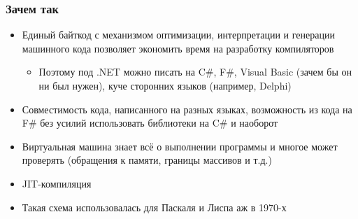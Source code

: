 \documentclass{../../slides-style}
\begin{document}
    \begin{frame}
        \frametitle{Зачем так}
        \begin{itemize}
            \item Единый байткод с механизмом оптимизации, интерпретации и генерации машинного кода позволяет экономить время на разработку компиляторов
            \begin{itemize}
                \item Поэтому под .NET можно писать на C\#, F\#, Visual Basic (зачем бы он ни был нужен), куче сторонних языков (например, Delphi)
            \end{itemize}
            \item Совместимость кода, написанного на разных языках, возможность из кода на F\# без усилий использовать библиотеки на C\# и наоборот
            \item Виртуальная машина знает всё о выполнении программы и многое может проверять (обращения к памяти, границы массивов и т.д.)
            \item JIT-компиляция
            \item Такая схема использовалась для Паскаля и Лиспа аж в 1970-х
        \end{itemize}
    \end{frame}
\end{document}
